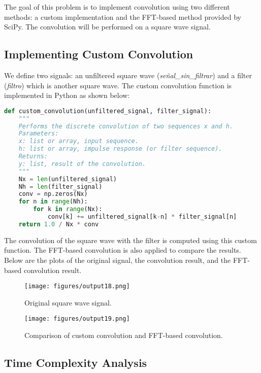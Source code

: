 \documentclass[10pt]{article}
\theoremstyle{definition}
\theoremstyle{remark}
\theoremstyle{definition}
\numberwithin{equation}{prob}
\begin{document}
The goal of this problem is to implement convolution using two different methods: a custom implementation and the FFT-based method provided by SciPy. The convolution will be performed on a square wave signal.

\subsection{Implementing Custom Convolution}

We define two signals: an unfiltered square wave (\textit{señal\_sin\_filtrar}) and a filter (\textit{filtro}) which is another square wave. The custom convolution function is implemented in Python as shown below:

\begin{lstlisting}[language=Python]
def custom_convolution(unfiltered_signal, filter_signal):
    """
    Performs the discrete convolution of two sequences x and h.
    Parameters:
    x: list or array, input sequence.
    h: list or array, impulse response (or filter sequence).
    Returns:
    y: list, result of the convolution.
    """
    Nx = len(unfiltered_signal)
    Nh = len(filter_signal)
    conv = np.zeros(Nx)
    for n in range(Nh):
        for k in range(Nx):
            conv[k] += unfiltered_signal[k-n] * filter_signal[n]
    return 1.0 / Nx * conv
\end{lstlisting}

The convolution of the square wave with the filter is computed using this custom function. The FFT-based convolution is also applied to compare the results. Below are the plots of the original signal, the convolution result, and the FFT-based convolution result.

\begin{figure}[H]
    \centering
    \texttt{[image: figures/output18.png]}  %
    \caption{Original square wave signal.}
\end{figure}

\begin{figure}[H]
    \centering
    \texttt{[image: figures/output19.png]}  %
    \caption{Comparison of custom convolution and FFT-based convolution.}
\end{figure}

\subsection{Time Complexity Analysis}
\end{document}
